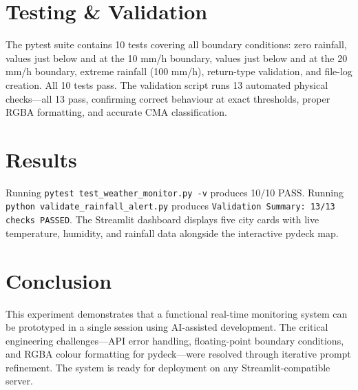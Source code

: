 \documentclass[12pt,a4paper]{article}
\begin{document}
\section{Testing \& Validation}
The pytest suite contains 10 tests covering all boundary conditions: zero rainfall, values just below and at the 10 mm/h boundary, values just below and at the 20 mm/h boundary, extreme rainfall (100 mm/h), return-type validation, and file-log creation. All 10 tests pass. The validation script runs 13 automated physical checks—all 13 pass, confirming correct behaviour at exact thresholds, proper RGBA formatting, and accurate CMA classification.

\section{Results}
Running \texttt{pytest test\_weather\_monitor.py -v} produces 10/10 PASS. Running \texttt{python validate\_rainfall\_alert.py} produces \texttt{Validation Summary: 13/13 checks PASSED}. The Streamlit dashboard displays five city cards with live temperature, humidity, and rainfall data alongside the interactive pydeck map.

\section{Conclusion}
This experiment demonstrates that a functional real-time monitoring system can be prototyped in a single session using AI-assisted development. The critical engineering challenges—API error handling, floating-point boundary conditions, and RGBA colour formatting for pydeck—were resolved through iterative prompt refinement. The system is ready for deployment on any Streamlit-compatible server.
\end{document}
